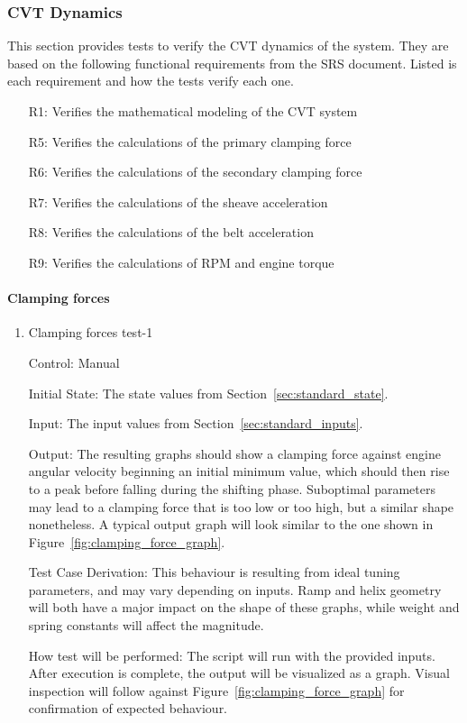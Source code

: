 \documentclass[12pt, titlepage]{article}
\begin{document}
\subsubsection{CVT Dynamics}

This section provides tests to verify the CVT dynamics of the system.
They are based on the following functional requirements from the SRS document.
Listed is each requirement and how the tests verify each one.
\begin{itemize}
  \item [R1:] Verifies the mathematical modeling of the CVT system
  \item [R5:] Verifies the calculations of the primary clamping force
  \item [R6:] Verifies the calculations of the secondary clamping force
  \item [R7:] Verifies the calculations of the sheave acceleration
  \item [R8:] Verifies the calculations of the belt acceleration
  \item [R9:] Verifies the calculations of RPM and engine torque
\end{itemize}

\paragraph{Clamping forces}

\begin{enumerate}
  
  \item{Clamping forces test-1\\}
  
  Control: Manual
            
  Initial State: The state values from Section~\ref{sec:standard_state}.
  
  Input: The input values from Section~\ref{sec:standard_inputs}.
            
  Output: The resulting graphs should show a clamping force against engine angular velocity beginning an initial minimum value, which should then rise to a peak before falling during the shifting phase. Suboptimal parameters may lead to a clamping force that is too low or too high, but a similar shape nonetheless. A typical output graph will look similar to the one shown in Figure~\ref{fig:clamping_force_graph}.
  
  Test Case Derivation: This behaviour is resulting from ideal tuning parameters, and may vary depending on inputs. Ramp and helix geometry will both have a major impact on the shape of these graphs, while weight and spring constants will affect the magnitude.
  
  How test will be performed: The script will run with the provided inputs. After execution is complete, the output will be visualized as a graph. Visual inspection will follow against Figure~\ref{fig:clamping_force_graph} for confirmation of expected behaviour.
  
\end{enumerate}
\end{document}
